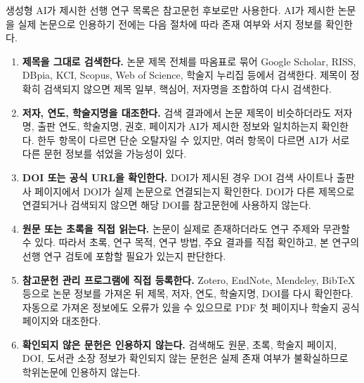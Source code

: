 
생성형 AI가 제시한 선행 연구 목록은 참고문헌 후보로만 사용한다.
AI가 제시한 논문을 실제 논문으로 인용하기 전에는 다음 절차에 따라 존재 여부와 서지 정보를 확인한다.

\begin{enumerate}
    \item \textbf{제목을 그대로 검색한다.}
    논문 제목 전체를 따옴표로 묶어 Google Scholar, RISS, DBpia, KCI, Scopus, Web of Science, 학술지 누리집 등에서 검색한다.
    제목이 정확히 검색되지 않으면 제목 일부, 핵심어, 저자명을 조합하여 다시 검색한다.

    \item \textbf{저자, 연도, 학술지명을 대조한다.}
    검색 결과에서 논문 제목이 비슷하더라도 저자명, 출판 연도, 학술지명, 권호, 페이지가 AI가 제시한 정보와 일치하는지 확인한다.
    한두 항목이 다르면 단순 오탈자일 수 있지만, 여러 항목이 다르면 AI가 서로 다른 문헌 정보를 섞었을 가능성이 있다.

    \item \textbf{DOI 또는 공식 URL을 확인한다.}
    DOI가 제시된 경우 DOI 검색 사이트나 출판사 페이지에서 DOI가 실제 논문으로 연결되는지 확인한다.
    DOI가 다른 제목으로 연결되거나 검색되지 않으면 해당 DOI를 참고문헌에 사용하지 않는다.

    \item \textbf{원문 또는 초록을 직접 읽는다.}
    논문이 실제로 존재하더라도 연구 주제와 무관할 수 있다.
    따라서 초록, 연구 목적, 연구 방법, 주요 결과를 직접 확인하고, 본 연구의 선행 연구 검토에 포함할 필요가 있는지 판단한다.

    \item \textbf{참고문헌 관리 프로그램에 직접 등록한다.}
    Zotero, EndNote, Mendeley, BibTeX 등으로 논문 정보를 가져온 뒤 제목, 저자, 연도, 학술지명, DOI를 다시 확인한다.
    자동으로 가져온 정보에도 오류가 있을 수 있으므로 PDF 첫 페이지나 학술지 공식 페이지와 대조한다.

    \item \textbf{확인되지 않은 문헌은 인용하지 않는다.}
    검색해도 원문, 초록, 학술지 페이지, DOI, 도서관 소장 정보가 확인되지 않는 문헌은 실제 존재 여부가 불확실하므로 학위논문에 인용하지 않는다.
\end{enumerate}

